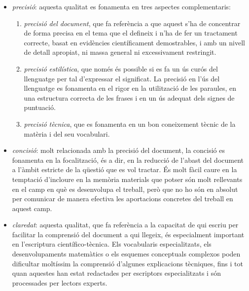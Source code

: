 \begin{itemize}
   \item \emph{precisió}: aquesta qualitat es fonamenta en tres aspectes complementaris:
   \begin{enumerate}

   \item \emph{precisió del document}, que fa referència a que aquest s'ha de concentrar de forma precisa en el tema que el defineix i n'ha de fer un tractament correcte, basat en evidències científicament demostrables, i amb un nivell de detall apropiat, ni massa general ni excessivament restringit.

   \item \emph{precisió estilística}, que només és possible si es fa un ús curós del llenguatge per tal d'expressar el significat. La precisió en l'ús del llenguatge es fonamenta en el rigor en la utilització de les paraules, en una estructura correcta de les frases i en un ús adequat dels signes de puntuació.

   \item \emph{precisió tècnica}, que es fonamenta en un bon coneixement tècnic de la matèria i del seu vocabulari.
   \end{enumerate}

   \item \emph{concisió}: molt relacionada amb la precisió del document, la concisió es fonamenta en la focalització, és a dir, en la reducció de l'abast del document a l'àmbit estricte de la qüestió que es vol tractar. És molt fàcil caure en la temptació d'incloure en la memòria materials que potser són molt rellevants en el camp en què es desenvolupa el treball, però que no ho són en absolut per comunicar de manera efectiva les aportacions concretes del treball en aquest camp.
%
   \item \emph{claredat}: aquesta qualitat, que fa referència a la capacitat de qui escriu per facilitar la comprensió del document a qui llegeix, és especialment important en l'escriptura científico-tècnica. Els vocabularis especialitzats, els desenvolupaments matemàtics o els esquemes conceptuals complexos poden dificultar moltíssim la comprensió d'algunes explicacions tècniques, fins i tot quan aquestes han estat redactades per escriptors especialitzats i són processades per lectors experts.


\end{itemize}
